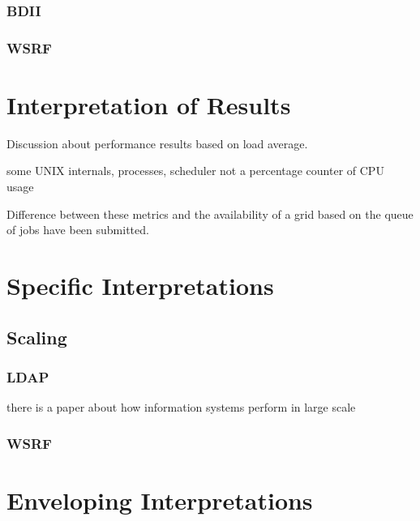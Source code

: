 \subsubsection{BDII}

\subsubsection{WSRF}

\newpage

\section{Interpretation of Results}


Discussion about performance results based on
load average.

some UNIX internals, processes, scheduler
not a percentage counter of CPU usage

\newpage

Difference between these metrics and the availability of 
a grid based on the queue of jobs have been submitted.

\newpage

\section{Specific Interpretations}

\subsection{Scaling}
\subsubsection{LDAP}

there is a paper about how information systems perform in large scale

\newpage

\subsubsection{WSRF}
\newpage
\section{Enveloping Interpretations}
